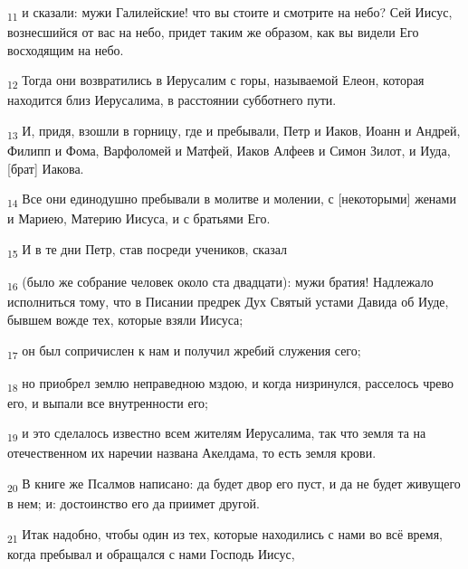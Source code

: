 \begin{tcolorbox}
\textsubscript{11} и сказали: мужи Галилейские! что вы стоите и смотрите на небо? Сей Иисус, вознесшийся от вас на небо, придет таким же образом, как вы видели Его восходящим на небо.
\end{tcolorbox}
\begin{tcolorbox}
\textsubscript{12} Тогда они возвратились в Иерусалим с горы, называемой Елеон, которая находится близ Иерусалима, в расстоянии субботнего пути.
\end{tcolorbox}
\begin{tcolorbox}
\textsubscript{13} И, придя, взошли в горницу, где и пребывали, Петр и Иаков, Иоанн и Андрей, Филипп и Фома, Варфоломей и Матфей, Иаков Алфеев и Симон Зилот, и Иуда, [брат] Иакова.
\end{tcolorbox}
\begin{tcolorbox}
\textsubscript{14} Все они единодушно пребывали в молитве и молении, с [некоторыми] женами и Мариею, Материю Иисуса, и с братьями Его.
\end{tcolorbox}
\begin{tcolorbox}
\textsubscript{15} И в те дни Петр, став посреди учеников, сказал
\end{tcolorbox}
\begin{tcolorbox}
\textsubscript{16} (было же собрание человек около ста двадцати): мужи братия! Надлежало исполниться тому, что в Писании предрек Дух Святый устами Давида об Иуде, бывшем вожде тех, которые взяли Иисуса;
\end{tcolorbox}
\begin{tcolorbox}
\textsubscript{17} он был сопричислен к нам и получил жребий служения сего;
\end{tcolorbox}
\begin{tcolorbox}
\textsubscript{18} но приобрел землю неправедною мздою, и когда низринулся, расселось чрево его, и выпали все внутренности его;
\end{tcolorbox}
\begin{tcolorbox}
\textsubscript{19} и это сделалось известно всем жителям Иерусалима, так что земля та на отечественном их наречии названа Акелдама, то есть земля крови.
\end{tcolorbox}
\begin{tcolorbox}
\textsubscript{20} В книге же Псалмов написано: да будет двор его пуст, и да не будет живущего в нем; и: достоинство его да приимет другой.
\end{tcolorbox}
\begin{tcolorbox}
\textsubscript{21} Итак надобно, чтобы один из тех, которые находились с нами во всё время, когда пребывал и обращался с нами Господь Иисус,
\end{tcolorbox}
